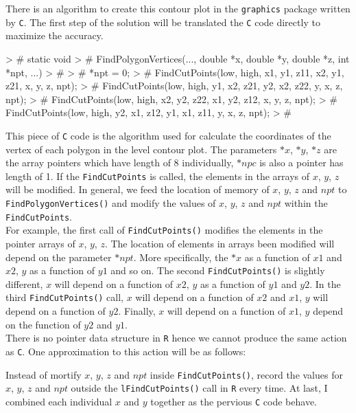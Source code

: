 \documentclass[paper=a4, fontsize=11pt]{report}
\begin{document}
There is an algorithm to create this contour plot in the \texttt{graphics} package written by \texttt{C}. The first step of the solution will be translated the \texttt{C} code directly to maximize the accuracy.\\

\begin{Schunk}
\begin{Sinput}
> # static void
> # FindPolygonVertices(..., double *x, double *y, double *z, int *npt, ...)
> # {
> #   *npt = 0;
> #   FindCutPoints(low, high, x1,  y1,  z11, x2,  y1,  z21, x, y, z, npt);
> #   FindCutPoints(low, high, y1,  x2,  z21, y2,  x2,  z22, y, x, z, npt);
> #   FindCutPoints(low, high, x2,  y2,  z22, x1,  y2,  z12, x, y, z, npt);
> #   FindCutPoints(low, high, y2,  x1,  z12, y1,  x1,  z11, y, x, z, npt);
> # }
\end{Sinput}
\end{Schunk}
This piece of \texttt{C} code is the algorithm used for calculate the coordinates of the vertex of each polygon in the level contour plot. The parameters $*x$, $*y$, $*z$ are the array pointers which have length of 8 individually, $*npc$ is also a pointer has length of 1. If the \texttt{FindCutPoints} is called, the elements in the arrays of $x$, $y$, $z$ will be modified. In general, we feed the location of memory of $x$, $y$, $z$ and $npt$ to \texttt{FindPolygonVertices()} and modify the values of $x$, $y$, $z$ and $npt$ within the \texttt{FindCutPoints}.\\

For example, the first call of \texttt{FindCutPoints()} modifies the elements in the pointer arrays of $x$, $y$, $z$. The location of elements in arrays been modified will depend on the parameter $*npt$. More specifically, the $*x$ as a function of $x1$ and $x2$, $y$ as a function of $y1$ and so on. The second \texttt{FindCutPoints()} is slightly different, $x$ will depend on a function of $x2$, $y$ as a function of $y1$ and $y2$. In the third \texttt{FindCutPoints()} call, $x$ will depend on a function of $x2$ and $x1$, $y$ will depend on a function of $y2$. Finally, $x$ will depend on a function of $x1$, $y$ depend on the function of $y2$ and $y1$. \\

There is no pointer data structure in \texttt{R} hence we cannot produce the same action as \texttt{C}. One approximation to this action will be as follows:
\begin{Schunk}
\end{Schunk}
Instead of mortify $x$, $y$, $z$ and $npt$ inside \texttt{FindCutPoints()}, record the values for $x$, $y$, $z$ and $npt$ outside the \texttt{lFindCutPoints()} call in \texttt{R} every time. At last, I combined each individual $x$ and $y$ together as the pervious \texttt{C} code behave. 
\end{document}
